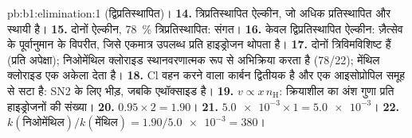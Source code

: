 \begin{solution}{pb:b1:elimination:1}
(द्विप्रतिस्थापित)।
\textbf{14.} त्रिप्रतिस्थापित ऐल्कीन, जो अधिक प्रतिस्थापित और स्थायी है।
\textbf{15.} दोनों ऐल्कीन, \qty{78}{\percent} त्रिप्रतिस्थापित: संगत।
\textbf{16.} केवल द्विप्रतिस्थापित ऐल्कीन: ज़ैत्सेव के
पूर्वानुमान के विपरीत, जिसे एकमात्र उपलब्ध प्रति हाइड्रोजन थोपता है।
\textbf{17.} दोनों त्रिविमविशिष्ट हैं (प्रति अपेक्षा); निओमेंथिल क्लोराइड
स्थानवरणात्मक रूप से अभिक्रिया करता है (78/22); मेंथिल क्लोराइड एक अकेला
 देता है।
\textbf{18.} Cl वहन करने वाला कार्बन द्वितीयक है और एक आइसोप्रोपिल
समूह से सटा है: SN2 के लिए भीड़, जबकि एथॉक्साइड  है।
\textbf{19.} $v \propto x\,n_{\mathrm{H}}$: क्रियाशील  का अंश गुणा
प्रति हाइड्रोजनों की संख्या।
\textbf{20.} $0.95 \times 2 = 1.90$।
\textbf{21.} $\num{5.0e-3} \times 1 = \num{5.0e-3}$।
\textbf{22.} \textbf{$k(\text{निओमेंथिल})/k(\text{मेंथिल}) = 1.90/\num{5.0e-3}
= 380$}।
\end{solution}
